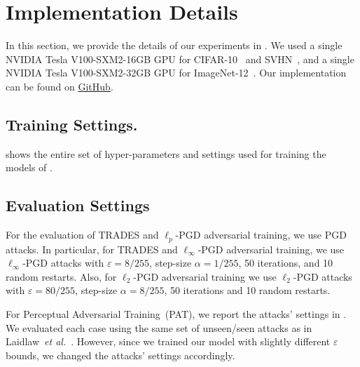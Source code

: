 \documentclass[runningheads]{llncs}
\newcommand{\etal}{\textit{et al.}}
\begin{document}
\section{Implementation Details}\label{ap:sec:imp_det}

In this section, we provide the details of our experiments in .
We used a single NVIDIA Tesla V100-SXM2-16GB GPU for CIFAR-10~\cite{krizhevsky2009learning} and SVHN~\cite{netzer2011reading}, and a single NVIDIA Tesla V100-SXM2-32GB GPU for ImageNet-12~\cite{russakovsky2015imagenet,liu2020refool}.
Our implementation can be found on \href{https://github.com/hmdolatabadi/ACS}{GitHub}.

\subsection{Training Settings.}
 shows the entire set of hyper-parameters and settings used for training the models of .

\subsection{Evaluation Settings}
For the evaluation of TRADES and $\ell_p$-PGD adversarial training, we use PGD attacks.
In particular, for TRADES and $\ell_\infty$-PGD adversarial training, we use $\ell_\infty$-PGD attacks with $\varepsilon=8/255$, step-size $\alpha=1/255$, 50 iterations, and 10 random restarts.
Also, for $\ell_2$-PGD adversarial training we use $\ell_2$-PGD attacks with $\varepsilon=80/255$, step-size $\alpha=8/255$, 50 iterations and 10 random restarts.

For Perceptual Adversarial Training~(PAT), we report the attacks' settings in .
We evaluated each case using the same set of unseen/seen attacks as in Laidlaw~\etal~\cite{laidlaw2021pat}.
However, since we trained our model with slightly different $\varepsilon$ bounds, we changed the attacks' settings accordingly.
\end{document}
